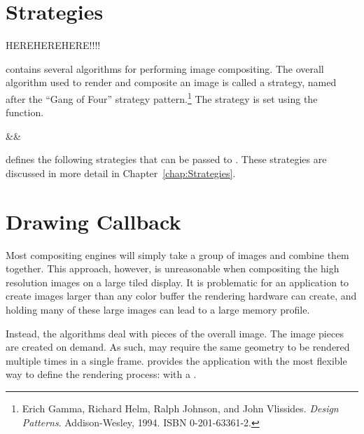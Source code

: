 

\section{Strategies}
\label{sec:Basic_Usage:Strategies}

HEREHEREHERE!!!!


\IceT contains several algorithms for performing image compositing.  The
overall algorithm used to render and composite an image is called a
strategy, named after the ``Gang of Four'' strategy pattern.\footnote{Erich
  Gamma, Richard Helm, Ralph Johnson, and John Vlissides.  \emph{Design
    Patterns}.  Addison-Wesley, 1994.  ISBN 0-201-63361-2.}  The strategy
is set using the  function.

\begin{Table}{3}
  \textC{(}&&\quad\textC{);}
\end{Table}

\IceT defines the following strategies that can be passed to
.  These strategies are discussed in more detail in
Chapter~\ref{chap:Strategies}.





\section{Drawing Callback}
\label{sec:Basic_Usage::Drawing_Callback}


Most compositing engines will simply take a group of images and combine them
together.  This approach, however, is unreasonable when compositing the
high resolution images on a large tiled display.  It is problematic for an
application to create images larger than any color buffer the rendering
hardware can create, and holding many of these large images can lead to a
large memory profile.

Instead, the \IceT algorithms deal with pieces of the overall image.  The
image pieces are created on demand.  As such, \IceT may require the same
geometry to be rendered multiple times in a single frame.  \IceT provides
the application with the most flexible way to define the rendering process:
with a .

